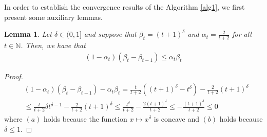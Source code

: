 \documentclass{article}
\numberwithin{equation}{section}
\newtheorem{lemma}{Lemma}[section]
\begin{document}
In order to establish the convergence results of the Algorithm \ref{alg1}, we first present some auxiliary lemmas.
\begin{lemma} \label{lemma_of_rk}
    Let $\delta \in (0,1]$  and suppose that $\beta_{t} = (t+1)^{\delta }$ and $\alpha_t = \frac{2}{t+2}$ for all $t\in \mathbb{N}$. Then, we have that 
    \begin{align}
        (1-\alpha_t)(\beta_{t}-\beta_{t-1}) \leq \alpha_t \beta_{t}
    \end{align} 
\end{lemma}
\begin{proof}
    \begin{align}
        &(1-\alpha_t)(\beta_{t}-\beta_{t-1}) -\alpha_t \beta_{t} = \frac{t}{t+2}\left((t+1)^{\delta}
        -t^{\delta}\right) -\frac{2}{t+2}(t+1)^{\delta} \nonumber \\
        & \overset{\mathop{(a)}}{\leq} \frac{t}{t+2}\delta t^{\delta -1} -\frac{2}{t+2}(t+1)^{\delta} 
        \overset{\mathop{(b)}}{\leq} \frac{t^{\delta}}{t+2} -\frac{2(t+1)^{\delta}}{t+2} \leq -\frac{(t+1)^{\delta}}{t+2} \leq 0
        \nonumber
    \end{align}
    where $(a)$ holds because the function $x \mapsto x^{\delta}$ is concave and $(b)$ holds
    because $\delta \leq 1$.
\end{proof}
\end{document}
